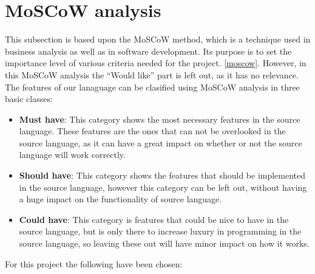\section{MoSCoW analysis}\label{analysis:moscow}
This subsection is based upon the MoSCoW method, which is a technique used in business analysis as well as in software development. Its purpose is to set the importance level of various criteria needed for the project. \ref{moscow}. However, in this MoSCoW analysis the ``Would like'' part is left out, as it has no relevance. \\

The features of our lanaguage can be clasified using MoSCoW analysis in three basic classes:
\begin{itemize}
\item \textbf{Must have}: This category shows the most necessary features in the source language. These features are the ones that can not be overlooked in the source language, as it can have a great impact on whether or not the source language will
work correctly. 

\item \textbf{Should have}: This category shows the features that should be implemented in the source language, however this category can be left out, without having a huge impact on the functionality of source language. 

\item \textbf{Could have}: This category is features that could be nice to have in the source language, but is only there to increase luxury in programming in the source language, so leaving these out will have minor impact on how it works. 
\end{itemize}


For this project the following have been chosen:\\

